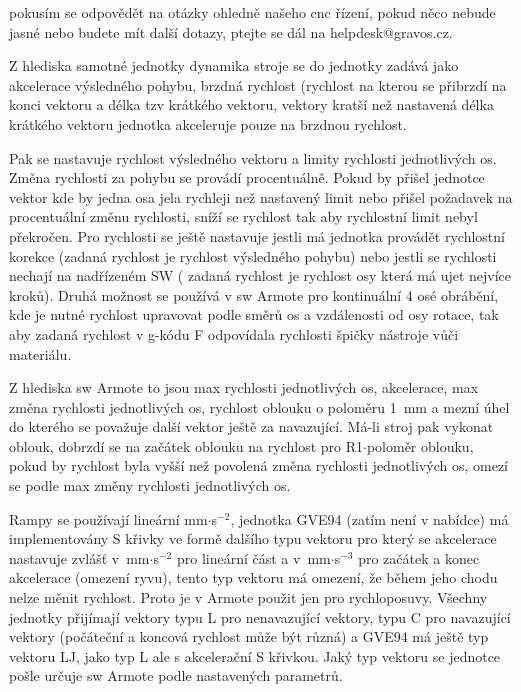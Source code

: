 \documentclass [a4paper,11pt,oneside,notitlepage,openright]{report} %
\begin{document}
\begin{appendix}
pokusím se odpovědět na otázky ohledně našeho cnc řízení, pokud něco nebude jasné nebo budete mít další dotazy, ptejte se dál na helpdesk@gravos.cz.

Z hlediska samotné jednotky dynamika stroje se do jednotky zadává jako akcelerace výsledného pohybu, brzdná rychlost (rychlost na kterou se přibrzdí na konci vektoru a délka tzv krátkého vektoru, vektory kratší než nastavená délka krátkého vektoru jednotka akceleruje pouze na brzdnou rychlost.

Pak se nastavuje rychlost výsledného vektoru a limity rychlosti jednotlivých os. Změna rychlosti za pohybu se provádí procentuálně. Pokud by přišel jednotce vektor kde by jedna osa jela rychleji než nastavený limit nebo přišel požadavek na procentuální změnu rychlosti, sníží se rychlost tak aby rychlostní limit nebyl překročen. Pro rychlosti se ještě nastavuje jestli má jednotka provádět rychlostní korekce (zadaná rychlost je rychlost výsledného pohybu) nebo jestli se rychlosti nechají na nadřízeném SW ( zadaná rychlost je rychlost osy která má ujet nejvíce kroků). Druhá možnost se používá v sw Armote pro kontinuální 4 osé obrábění, kde je nutné rychlost upravovat podle směrů os a vzdálenosti od osy rotace, tak aby zadaná rychlost v g-kódu F odpovídala rychlosti špičky nástroje vůči materiálu.

Z hlediska sw Armote to jsou max rychlosti jednotlivých os, akcelerace, max změna rychlosti jednotlivých os, rychlost oblouku o poloměru 1~mm a mezní úhel do kterého se považuje další vektor ještě za navazující. Má-li stroj pak vykonat oblouk, dobrzdí se na začátek oblouku na rychlost pro R1$\cdot$poloměr oblouku, pokud by rychlost byla vyšší než povolená změna rychlosti jednotlivých os, omezí se podle max změny rychlosti jednotlivých os.

Rampy se používají lineární mm$\cdot$s$^{-2}$, jednotka GVE94 (zatím není v nabídce) má implementovány S křivky ve formě dalšího typu vektoru pro který se akcelerace nastavuje zvlášť v~mm$\cdot$s$^{-2}$ pro lineární část a v~mm$\cdot$s$^{-3}$ pro začátek a konec akcelerace (omezení ryvu), tento typ vektoru má omezení, že během jeho chodu nelze měnit rychlost. Proto je v Armote použit jen pro rychloposuvy. Všechny jednotky přijímají vektory typu L pro nenavazující vektory, typu C pro navazující vektory (počáteční a koncová rychlost může být různá) a GVE94 má ještě typ vektoru LJ, jako typ L ale s akcelerační S křivkou. Jaký typ vektoru se jednotce pošle určuje sw Armote podle nastavených parametrů.


\end{appendix}
\end{document}
